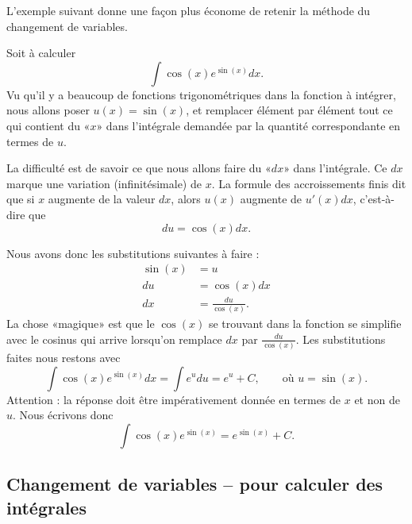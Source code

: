 L'exemple suivant donne une façon plus économe de retenir la méthode du changement de variables.

\begin{example}\label{exempleprimitivechangvar}
    Soit à calculer
    \begin{equation}
        \int \cos(x) e^{\sin(x)}dx.
    \end{equation}
    Vu qu'il y a beaucoup de fonctions trigonométriques dans la fonction à intégrer, nous allons poser \( u(x)=\sin(x)\), et remplacer élément par élément tout ce qui contient du «$x$»  dans l'intégrale demandée par la quantité correspondante en termes de \( u\).

    La difficulté est de savoir ce que nous allons faire du «\( dx\)» dans l'intégrale. Ce \( dx \) marque une variation (infinitésimale) de \( x\). La formule des accroissements finis dit que si \( x\) augmente de la valeur \( dx\), alors \( u(x)\) augmente de $u'(x)dx$, c'est-à-dire que
    \begin{equation}
        du=\cos(x)dx.
    \end{equation}

    Nous avons donc les substitutions suivantes à faire :
    \begin{subequations}
        \begin{align}
            \sin(x)&=u\\
            du&=\cos(x)dx\\
            dx&=\frac{ du }{ \cos(x) }.
        \end{align}
    \end{subequations}
    La chose «magique» est que le \( \cos(x)\) se trouvant dans la fonction se simplifie avec le cosinus qui arrive lorsqu'on remplace \( dx\) par \( \frac{ du }{ \cos(x) }\). Les substitutions faites nous restons avec
    \begin{equation}
        \int\cos(x) e^{\sin(x)}dx=\int e^{u}du=e^u + C, \qquad \text{où } u= \sin(x).
    \end{equation}
   Attention : la réponse doit \^etre impérativement donnée en termes de \( x\) et non de \( u\). Nous écrivons donc
    \begin{equation}
        \int \cos(x) e^{\sin(x)}= e^{\sin(x)}+C.
    \end{equation}
\end{example}

\subsection{Changement de variables -- pour calculer des intégrales}


